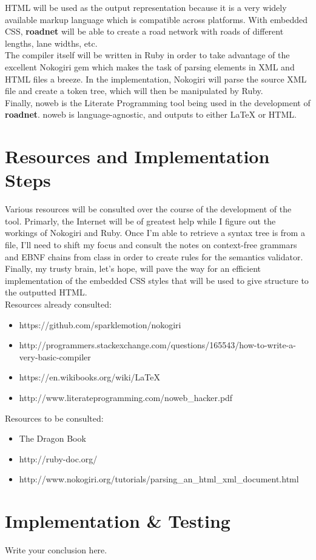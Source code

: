 \documentclass{article}
\begin{document}
HTML will be used as the output representation because it is a very widely available markup language which is compatible across platforms. With embedded CSS, \textbf{roadnet} will be able to create a road network with roads of different lengths, lane widths, etc.\\

The compiler itself will be written in Ruby in order to take advantage of the excellent Nokogiri gem which makes the task of parsing elements in XML and HTML files a breeze. In the implementation, Nokogiri will parse the source XML file and create a token tree, which will then be manipulated by Ruby.\\

Finally, noweb is the Literate Programming tool being used in the development of \textbf{roadnet}. noweb is language-agnostic, and outputs to either \LaTeX{} or HTML. 

\section{Resources and Implementation Steps}
Various resources will be consulted over the course of the development of the tool. Primarly, the Internet will be of greatest help while I figure out the workings of Nokogiri and Ruby. Once I'm able to retrieve a syntax tree is from a file, I'll need to shift my focus and consult the notes on context-free grammars and EBNF chains from class in order to create rules for the semantics validator. Finally, my trusty brain, let's hope, will pave the way for an efficient implementation of the embedded CSS styles that will be used to give structure to the outputted HTML.\\

Resources already consulted:
\begin{itemize}  
\item https://github.com/sparklemotion/nokogiri
\item http://programmers.stackexchange.com/questions/165543/how-to-write-a-very-basic-compiler
\item https://en.wikibooks.org/wiki/LaTeX
\item http://www.literateprogramming.com/noweb\_hacker.pdf
\end{itemize}

Resources to be consulted:
\begin{itemize}  
\item The Dragon Book
\item http://ruby-doc.org/
\item http://www.nokogiri.org/tutorials/parsing\_an\_html\_xml\_document.html
\end{itemize}

\section{Implementation \& Testing}
Write your conclusion here.
\end{document}
